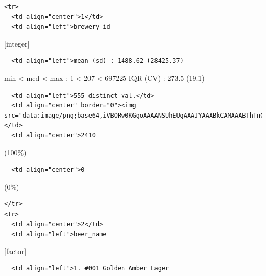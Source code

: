 \documentclass[]{article}
\begin{document}
\begin{verbatim}
<tr>
  <td align="center">1</td>
  <td align="left">brewery_id
\end{verbatim}

{[}integer{]}

\begin{verbatim}
  <td align="left">mean (sd) : 1488.62 (28425.37)
\end{verbatim}

min \textless{} med \textless{} max : 1 \textless{} 207 \textless{}
697225 IQR (CV) : 273.5 (19.1)

\begin{verbatim}
  <td align="left">555 distinct val.</td>
  <td align="center" border="0"><img src="data:image/png;base64,iVBORw0KGgoAAAANSUhEUgAAAJYAAABkCAMAAABThTnCAAAADFBMVEX9/v2mpqby8vL9/v28xacEAAAABHRSTlP///8AQCqp9AAAAJNJREFUaIHt27ENgzAAAEET9t+ZIiAiBSF9ZRd3E/wCP/YljdkBz2QV36ztNrnndGZ9LrLeyCpkFbIKWYWsQlYhq5BVyCpkFbIKWYWsQlYhq5BVyCpkFbIKWYWsQlYhq5BVyCpkFbIKWYWsQlYhq5BVyCpkFbIKWYWsQlYhq5BVyCpkFbIKWcXfrDXdT9ZyZBWLZh3aJKoJ7TmyggAAAABJRU5ErkJggg=="></td>
  <td align="center">2410
\end{verbatim}

(100\%)

\begin{verbatim}
  <td align="center">0
\end{verbatim}

(0\%)

\begin{verbatim}
</tr>
<tr>
  <td align="center">2</td>
  <td align="left">beer_name
\end{verbatim}

{[}factor{]}

\begin{verbatim}
  <td align="left">1. #001 Golden Amber Lager
\end{verbatim}
\end{document}
